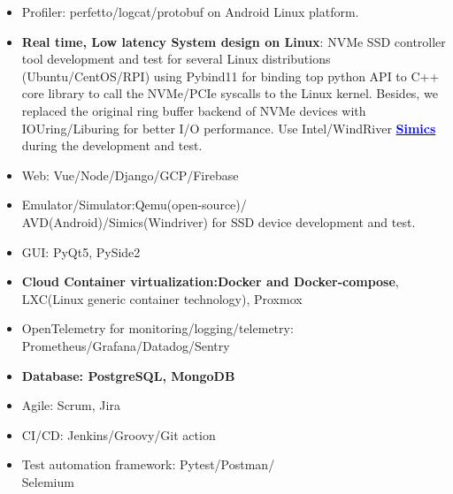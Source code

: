 \documentclass[11pt]{article}
\begin{document}
\begin{multicols*}{2}
\vspace{-8em}
\begin{theorembox}\label{software-dev}
\begin{itemize}[noitemsep]
    \item Profiler: perfetto/logcat/protobuf on Android Linux platform.
    \item \textbf{Real time, Low latency System design on Linux}: NVMe SSD controller tool development and test 
    for several Linux distributions (Ubuntu/CentOS/RPI) using Pybind11 
    for binding top python API to C++ core library to call the NVMe/PCIe syscalls to the Linux kernel.
    Besides, we replaced the original ring buffer backend of  NVMe devices with IOUring/Liburing 
    for better I/O performance. Use Intel/WindRiver \href{https://www.windriver.com/products/simics}{\textbf{\textcolor{blue}{Simics}}} during the development and test.
    \item Web: Vue/Node/Django/GCP/Firebase
    \item Emulator/Simulator:Qemu(open-source)/\\AVD(Android)/Simics(Windriver) for SSD device development and test.
    \item GUI: PyQt5, PySide2
    \item \textbf{Cloud Container virtualization:Docker and Docker-compose}, LXC(Linux generic container technology), Proxmox
    \item OpenTelemetry for monitoring/logging/telemetry:\\ Prometheus/Grafana/Datadog/Sentry
    \item \textbf{Database: PostgreSQL, MongoDB}
    \item Agile: Scrum, Jira
\end{itemize}
\end{theorembox}

\vspace{-10em}

\begin{examplebox}
\begin{itemize}[noitemsep]
    \item CI/CD: Jenkins/Groovy/Git action
    \item Test automation framework: Pytest/Postman/\\Selemium
\end{itemize}
\end{examplebox}


\end{multicols*}
\end{document}
